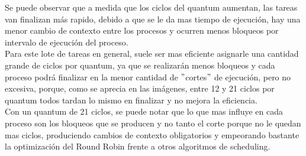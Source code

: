 Se puede observar que a medida que los ciclos del quantum aumentan, las tareas van finalizan más rapido, debido a que se le da mas tiempo de ejecución, hay una menor cambio de contexto entre los procesos y ocurren menos bloqueos por intervalo de ejecución del proceso.
\\
Para este lote de tareas en general, suele ser mas eficiente asignarle una cantidad grande de ciclos por quantum,  ya que se realizarán menos bloqueos y cada proceso podrá finalizar en la menor cantidad de $"$cortes$"$ de ejecución, pero no excesiva, porque, como se aprecia en las imágenes, entre 12 y 21  ciclos por quantum todos tardan lo mismo en finalizar y no mejora la eficiencia.
\\
Con un quantum de 21 ciclos, se puede notar que lo que mas influye en cada proceso son los bloqueos que se producen y no tanto el corte porque no le quedan mas ciclos, produciendo cambios de contexto obligatorios y empeorando bastante la optimización del Round Robin frente a otros algoritmos de scheduling.


